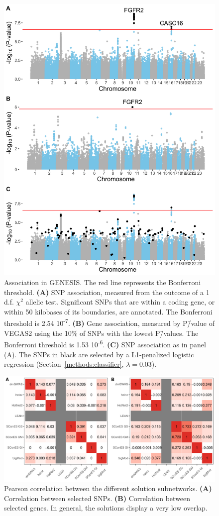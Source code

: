 \documentclass[twocolumn, 11pt]{article}
\begin{document}
\begin{figure}[htbp]
  \centering
  \includegraphics[width=.7\linewidth]{./figures/sfigure_2.png}
  \caption{Association in GENESIS. The red line represents the Bonferroni threshold. \textbf{(A)} SNP association, measured from the outcome of a 1 d.f. $\chi^2$ allelic test. Significant SNPs that are within a coding gene, or within 50 kilobases of its boundaries, are annotated. The Bonferroni threshold is 2.54 \texttimes{} 10\textsuperscript{-7}. \textbf{(B)} Gene association, measured by P\=/value of VEGAS2 \cite{mishra_vegas2:_2015} using the 10\% of SNPs with the lowest P\=/values. The Bonferroni threshold is 1.53 \texttimes{} 10\textsuperscript{-6}. \textbf{(C)} SNP association as in panel (A). The SNPs in black are selected by a L1-penalized logistic regression (Section~\ref{methods:classifier}, $\lambda = 0.03$).}
  \label{sfig:snp_gene_manhattan}
\end{figure}

\begin{figure}[htbp]
\centering
\includegraphics[width=.9\linewidth]{./figures/sfigure_3.pdf}
\caption{Pearson correlation between the different solution subnetworks. \textbf{(A)} Correlation between selected SNPs. \textbf{(B)} Correlation between selected genes. In general, the solutions display a very low overlap.}
\label{sfig:pearson_methods}
\end{figure}
\end{document}
